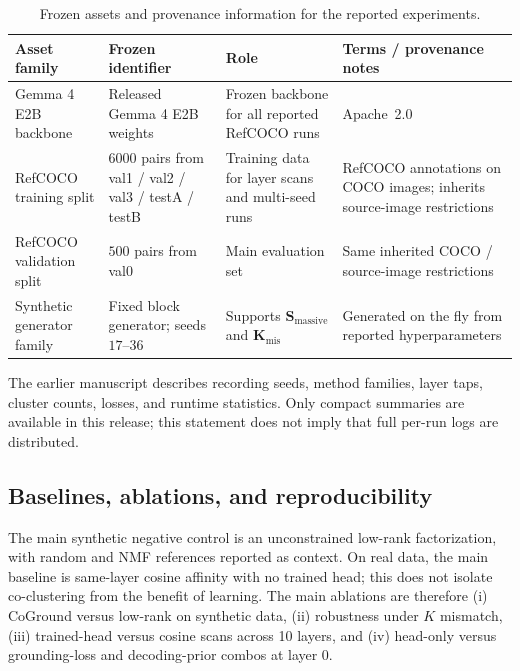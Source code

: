 \documentclass[11pt,a4paper]{article}
\begin{document}
\begin{table}[htbp]
\caption{Frozen assets and provenance information for the reported experiments.}
\label{tab:assets}
\centering
\footnotesize
\setlength{\tabcolsep}{3pt}
\setlength{\tabcolsep}{4pt}
\begin{tabularx}{\linewidth}{@{}L{.16\linewidth}L{.23\linewidth}Y Y@{}}
\toprule
Asset family & Frozen identifier & Role & Terms / provenance notes \\
\midrule
Gemma 4 E2B backbone & Released Gemma 4 E2B weights & Frozen backbone for all reported RefCOCO runs & Apache~2.0 \\
RefCOCO training split & $6000$ pairs from val1 / val2 / val3 / testA / testB & Training data for layer scans and multi-seed runs & RefCOCO annotations on COCO images; inherits source-image restrictions \\
RefCOCO validation split & $500$ pairs from val0 & Main evaluation set & Same inherited COCO / source-image restrictions \\
Synthetic generator family & Fixed block generator; seeds $17$--$36$ & Supports $\textbf{S}_{\mathrm{massive}}$ and $\textbf{K}_{\mathrm{mis}}$ & Generated on the fly from reported hyperparameters \\
\bottomrule
\end{tabularx}
\end{table}

The earlier manuscript describes recording seeds, method families, layer taps, cluster counts, losses, and runtime statistics. Only compact summaries are available in this release; this statement does not imply that full per-run logs are distributed.

\subsection{Baselines, ablations, and reproducibility}

The main synthetic negative control is an unconstrained low-rank factorization, with random and NMF references reported as context. On real data, the main baseline is same-layer cosine affinity with no trained head; this does not isolate co-clustering from the benefit of learning. The main ablations are therefore (i) CoGround versus low-rank on synthetic data, (ii) robustness under $K$ mismatch, (iii) trained-head versus cosine scans across 10 layers, and (iv) head-only versus grounding-loss and decoding-prior combos at layer $0$.
\end{document}
